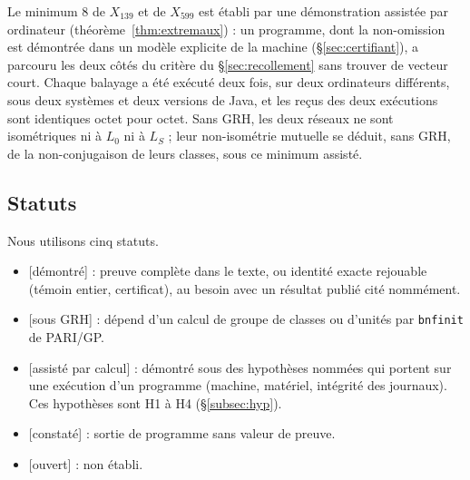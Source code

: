 \documentclass[11pt,a4paper]{amsart}
\theoremstyle{plain}
\theoremstyle{definition}
\numberwithin{equation}{section}
\newcommand{\Lz}{L_{0}}
\newcommand{\LS}{L_{S}}
\newcommand{\st}[1]{\textup{\textsf{\small[#1]}}}
\newcommand{\DEM}{\st{démontré}}
\newcommand{\GRH}{\st{sous GRH}}
\newcommand{\ASS}{\st{assisté par calcul}}
\newcommand{\CONS}{\st{constaté}}
\newcommand{\OUV}{\st{ouvert}}
\begin{document}
Le minimum $8$ de $X_{139}$ et de $X_{599}$ est établi par une démonstration assistée par ordinateur (théorème~\ref{thm:extremaux}) : un programme, dont la non-omission est démontrée dans un modèle explicite de la machine (\S\ref{sec:certifiant}), a parcouru les deux côtés du critère du \S\ref{sec:recollement} sans trouver de vecteur court. Chaque balayage a été exécuté deux fois, sur deux ordinateurs différents, sous deux systèmes et deux versions de Java, et les reçus des deux exécutions sont identiques octet pour octet. Sans GRH, les deux réseaux ne sont isométriques ni à $\Lz$ ni à $\LS$ ; leur non-isométrie mutuelle se déduit, sans GRH, de la non-conjugaison de leurs classes, sous ce minimum assisté.

\subsection{Statuts}\label{subsec:statuts}
Nous utilisons cinq statuts.
\begin{itemize}
\item \DEM{} : preuve complète dans le texte, ou identité exacte rejouable (témoin entier, certificat), au besoin avec un résultat publié cité nommément.
\item \GRH{} : dépend d'un calcul de groupe de classes ou d'unités par \texttt{bnfinit} de PARI/GP.
\item \ASS{} : démontré sous des hypothèses nommées qui portent sur une exécution d'un programme (machine, matériel, intégrité des journaux). Ces hypothèses sont H1 à H4 (\S\ref{subsec:hyp}).
\item \CONS{} : sortie de programme sans valeur de preuve.
\item \OUV{} : non établi.
\end{itemize}
\end{document}
